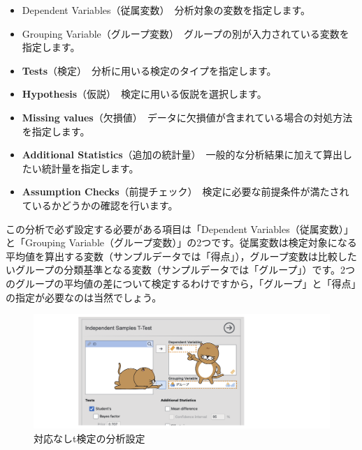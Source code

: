 \documentclass[
  12pt,
  a5jpaper,
  lualatex, ja=standard]{bxjsbook}
\providecommand{\tightlist}{%
  \setlength{\itemsep}{0pt}\setlength{\parskip}{0pt}}
\newenvironment{jmvsettings}{%
	\begin{center}%
	\begin{tcolorbox}[%
		title=設定項目,
		colframe=gmoji,
		colbacktitle=gmoji,
		colback=gmoji!2!white,
		breakable,
		width=.9\textwidth,
		]\small\addtolength{\leftmargini}{-3\labelsep}%
	}%
	{\end{tcolorbox}\end{center}}
\begin{document}
\begin{jmvsettings}

\begin{itemize}
\tightlist
\item
  Dependent Variables（従属変数）　分析対象の変数を指定します。
\item
  Grouping Variable（グループ変数）　グループの別が入力されている変数を指定します。
\item
  \textbf{Tests}（検定）　分析に用いる検定のタイプを指定します。
\item
  \textbf{Hypothesis}（仮説）　検定に用いる仮説を選択します。
\item
  \textbf{Missing values}（欠損値）　データに欠損値が含まれている場合の対処方法を指定します。
\item
  \textbf{Additional Statistics}（追加の統計量）　一般的な分析結果に加えて算出したい統計量を指定します。
\item
  \textbf{Assumption Checks}（前提チェック）　検定に必要な前提条件が満たされているかどうかの確認を行います。
\end{itemize}

\end{jmvsettings}

この分析で必ず設定する必要がある項目は「Dependent Variables（従属変数）」と「Grouping Variable（グループ変数）」の2つです。従属変数は検定対象になる平均値を算出する変数（サンプルデータでは「得点」），グループ変数は比較したいグループの分類基準となる変数（サンプルデータでは「グループ」）です。2つのグループの平均値の差について検定するわけですから，「グループ」と「得点」の指定が必要なのは当然でしょう。

\begin{figure}[!ht]

{\centering \includegraphics[width=1\linewidth]{images/ttests/t-setting} 

}

\caption{対応なしt検定の分析設定}\label{fig:ttests-t-setting}
\end{figure}
\end{document}
